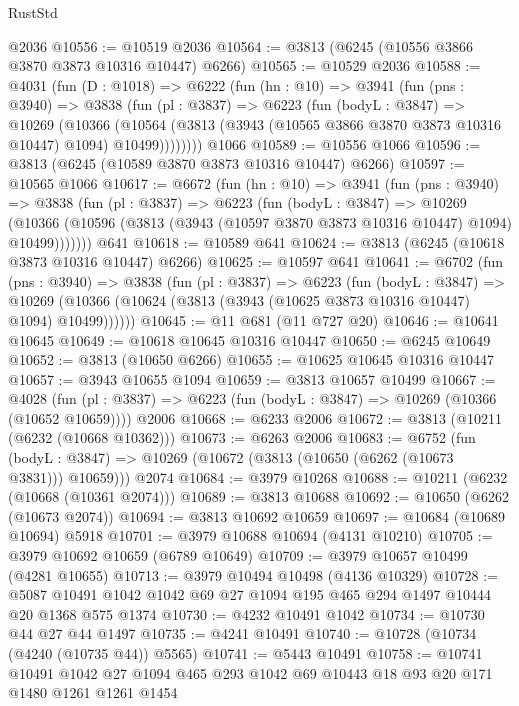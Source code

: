 \begin{lexlean}{RustStd}
\begin{coremodule}
{\begin{coremodule}
{{{{{{{{{{{{{{{{{{{{{{{{{{{{{{{{{{{    @2036
@10556 := @10519 @2036
@10564 := @3813 (@6245 (@10556 @3866 @3870 @3873 @10316 @10447) @6266)
@10565 := @10529 @2036
@10588 := @4031
    (fun (D : @1018) =>
    @6222
      (fun (hn : @10) =>
      @3941
        (fun (pns : @3940) =>
        @3838
          (fun (pl : @3837) =>
          @6223
            (fun (bodyL : @3847) =>
            @10269
              (@10366
                (@10564 (@3813 (@3943 (@10565 @3866 @3870 @3873 @10316 @10447) @1094) @10499))))))))
    @1066
@10589 := @10556 @1066
@10596 := @3813 (@6245 (@10589 @3870 @3873 @10316 @10447) @6266)
@10597 := @10565 @1066
@10617 := @6672
    (fun (hn : @10) =>
    @3941
      (fun (pns : @3940) =>
      @3838
        (fun (pl : @3837) =>
        @6223
          (fun (bodyL : @3847) =>
          @10269
            (@10366 (@10596 (@3813 (@3943 (@10597 @3870 @3873 @10316 @10447) @1094) @10499)))))))
    @641
@10618 := @10589 @641
@10624 := @3813 (@6245 (@10618 @3873 @10316 @10447) @6266)
@10625 := @10597 @641
@10641 := @6702
    (fun (pns : @3940) =>
    @3838
      (fun (pl : @3837) =>
      @6223
        (fun (bodyL : @3847) =>
        @10269 (@10366 (@10624 (@3813 (@3943 (@10625 @3873 @10316 @10447) @1094) @10499))))))
@10645 := @11 @681 (@11 @727 @20)
@10646 := @10641 @10645
@10649 := @10618 @10645 @10316 @10447
@10650 := @6245 @10649
@10652 := @3813 (@10650 @6266)
@10655 := @10625 @10645 @10316 @10447
@10657 := @3943 @10655 @1094
@10659 := @3813 @10657 @10499
@10667 := @4028
    (fun (pl : @3837) => @6223 (fun (bodyL : @3847) => @10269 (@10366 (@10652 @10659))))
    @2006
@10668 := @6233 @2006
@10672 := @3813 (@10211 (@6232 (@10668 @10362)))
@10673 := @6263 @2006
@10683 := @6752
    (fun (bodyL : @3847) => @10269 (@10672 (@3813 (@10650 (@6262 (@10673 @3831))) @10659)))
    @2074
@10684 := @3979 @10268
@10688 := @10211 (@6232 (@10668 (@10361 @2074)))
@10689 := @3813 @10688
@10692 := @10650 (@6262 (@10673 @2074))
@10694 := @3813 @10692 @10659
@10697 := @10684 (@10689 @10694) @5918
@10701 := @3979 @10688 @10694 (@4131 @10210)
@10705 := @3979 @10692 @10659 (@6789 @10649)
@10709 := @3979 @10657 @10499 (@4281 @10655)
@10713 := @3979 @10494 @10498 (@4136 @10329)
@10728 := @5087 @10491 @1042 @1042 @69 @27 @1094 @195 @465 @294 @1497 @10444 @20 @1368 @575 @1374
@10730 := @4232 @10491 @1042
@10734 := @10730 @44 @27 @44 @1497
@10735 := @4241 @10491
@10740 := @10728 (@10734 (@4240 (@10735 @44)) @5565)
@10741 := @5443 @10491
@10758 := @10741
    @10491
    @1042
    @27
    @1094
    @465
    @293
    @1042
    @69
    @10443
    @18
    @93
    @20
    @171
    @1480
    @1261
    @1261
    @1454
}}}}}}}}}}}}}}}}}}}}}}}}}}}}}}}}}}}
\end{coremodule}}
\end{coremodule}
\end{lexlean}
